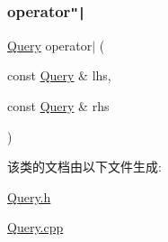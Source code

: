 \subsubsection{\texorpdfstring{operator\texttt{"|}}{operator|}}
{\footnotesize\ttfamily \hyperlink{classQuery}{Query} operator$\vert$ (\begin{DoxyParamCaption}\item[{const \hyperlink{classQuery}{Query} \&}]{lhs,  }\item[{const \hyperlink{classQuery}{Query} \&}]{rhs }\end{DoxyParamCaption})\hspace{0.3cm}{\ttfamily [friend]}}



该类的文档由以下文件生成\+:\begin{DoxyCompactItemize}
\item 
\hyperlink{Query_8h}{Query.\+h}\item 
\hyperlink{Query_8cpp}{Query.\+cpp}\end{DoxyCompactItemize}
